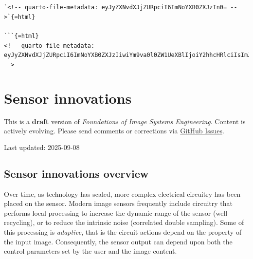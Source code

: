 \documentclass[
  letterpaper,
]{book}
\begin{document}
\begin{verbatim}




`<!-- quarto-file-metadata: eyJyZXNvdXJjZURpciI6ImNoYXB0ZXJzIn0= -->`{=html}

```{=html}
<!-- quarto-file-metadata: eyJyZXNvdXJjZURpciI6ImNoYXB0ZXJzIiwiYm9va0l0ZW1UeXBlIjoiY2hhcHRlciIsImJvb2tJdGVtTnVtYmVyIjoyMCwiYm9va0l0ZW1GaWxlIjoiY2hhcHRlcnMvc2Vuc29ycy0wNy1pbm5vdmF0aW9ucy5xbWQiLCJib29rSXRlbURlcHRoIjoxfQ== -->
\end{verbatim}

\chapter{Sensor innovations}\label{sec-sensor-innovations}

\begin{tcolorbox}[enhanced jigsaw, opacityback=0, breakable, coltitle=black, leftrule=.75mm, left=2mm, colframe=quarto-callout-warning-color-frame, opacitybacktitle=0.6, bottomtitle=1mm, bottomrule=.15mm, toprule=.15mm, title=\textcolor{quarto-callout-warning-color}{\faExclamationTriangle}\hspace{0.5em}{Work in Progress}, titlerule=0mm, toptitle=1mm, colback=white, rightrule=.15mm, colbacktitle=quarto-callout-warning-color!10!white, arc=.35mm]

This is a \textbf{draft} version of \emph{Foundations of Image Systems
Engineering}. Content is actively evolving. Please send comments or
corrections via \href{https://github.com/wandell/FISE-git/issues}{GitHub
Issues}.

Last updated: 2025-09-08

\end{tcolorbox}

\section{Sensor innovations
overview}\label{sec-sensor-innovations-overview}

Over time, as technology has scaled, more complex electrical circuitry
has been placed on the sensor. Modern image sensors frequently include
circuitry that performs local processing to increase the dynamic range
of the sensor (well recycling), or to reduce the intrinsic noise
(correlated double sampling). Some of this processing is
\emph{adaptive}, that is the circuit actions depend on the property of
the input image. Consequently, the sensor output can depend upon both
the control parameters set by the user and the image content.
\end{document}
